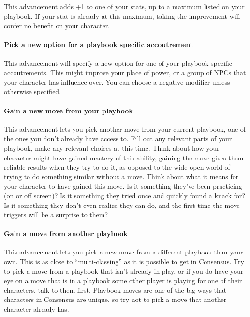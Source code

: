 \documentclass[
]{article}
\begin{document}
This advancement adds +1 to one of your stats, up to a maximum listed on
your playbook. If your stat is already at this maximum, taking the
improvement will confer no benefit on your character.

\hypertarget{pick-a-new-option-for-a-playbook-specific-accoutrement}{%
\paragraph{Pick a new option for a playbook specific
accoutrement}\label{pick-a-new-option-for-a-playbook-specific-accoutrement}}

This advancement will specify a new option for one of your playbook
specific accoutrements. This might improve your place of power, or a
group of NPCs that your character has influence over. You can choose a
negative modifier unless otherwise specified.

\hypertarget{gain-a-new-move-from-your-playbook}{%
\paragraph{Gain a new move from your
playbook}\label{gain-a-new-move-from-your-playbook}}

This advancement lets you pick another move from your current playbook,
one of the ones you don't already have access to. Fill out any relevant
parts of your playbook, make any relevant choices at this time. Think
about how your character might have gained mastery of this ability,
gaining the move gives them reliable results when they try to do it, as
opposed to the wide-open world of trying to do something similar without
a move. Think about what it means for your character to have gained this
move. Is it something they've been practicing (on or off screen)? Is it
something they tried once and quickly found a knack for? Is it something
they don't even realize they can do, and the first time the move
triggers will be a surprise to them?

\hypertarget{gain-a-move-from-another-playbook}{%
\paragraph{Gain a move from another
playbook}\label{gain-a-move-from-another-playbook}}

This advancement lets you pick a new move from a different playbook than
your own. This is as close to ``multi-classing'' as it is possible to
get in Consensus. Try to pick a move from a playbook that isn't already
in play, or if you do have your eye on a move that is in a playbook some
other player is playing for one of their characters, talk to them first.
Playbook moves are one of the big ways that characters in Consensus are
unique, so try not to pick a move that another character already has.
\end{document}
